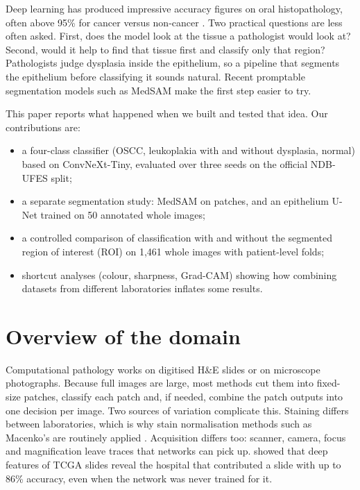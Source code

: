 \documentclass[10pt,twocolumn]{article}
\begin{document}
Deep learning has produced impressive accuracy figures on oral histopathology, often above 95\% for cancer versus non-cancer \citep{fati2022,das2023,albalawi2024}. Two practical questions are less often asked. First, does the model look at the tissue a pathologist would look at? Second, would it help to find that tissue first and classify only that region? Pathologists judge dysplasia inside the epithelium, so a pipeline that segments the epithelium before classifying it sounds natural. Recent promptable segmentation models such as MedSAM \citep{ma2024} make the first step easier to try.

This paper reports what happened when we built and tested that idea. Our contributions are:
\begin{itemize}
  \item a four-class classifier (OSCC, leukoplakia with and without dysplasia, normal) based on ConvNeXt-Tiny, evaluated over three seeds on the official NDB-UFES split;
  \item a separate segmentation study: MedSAM on patches, and an epithelium U-Net trained on 50 annotated whole images;
  \item a controlled comparison of classification with and without the segmented region of interest (ROI) on 1,461 whole images with patient-level folds;
  \item shortcut analyses (colour, sharpness, Grad-CAM) showing how combining datasets from different laboratories inflates some results.
\end{itemize}

\section{Overview of the domain}

Computational pathology works on digitised H\&E slides or on microscope photographs. Because full images are large, most methods cut them into fixed-size patches, classify each patch and, if needed, combine the patch outputs into one decision per image. Two sources of variation complicate this. Staining differs between laboratories, which is why stain normalisation methods such as Macenko's are routinely applied \citep{hoque2024}. Acquisition differs too: scanner, camera, focus and magnification leave traces that networks can pick up. \citet{dehkharghanian2023} showed that deep features of TCGA slides reveal the hospital that contributed a slide with up to 86\% accuracy, even when the network was never trained for it.
\end{document}
